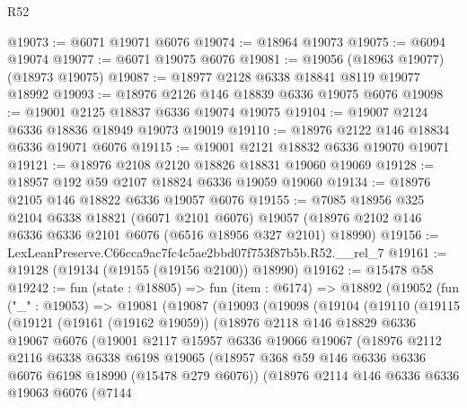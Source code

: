 \begin{lexlean}{R52}
\begin{coremodule}
@19073 := @6071 @19071 @6076
@19074 := @18964 @19073
@19075 := @6094 @19074
@19077 := @6071 @19075 @6076
@19081 := @19056 (@18963 @19077) (@18973 @19075)
@19087 := @18977 @2128 @6338 @18841 @8119 @19077 @18992
@19093 := @18976 @2126 @146 @18839 @6336 @19075 @6076
@19098 := @19001 @2125 @18837 @6336 @19074 @19075
@19104 := @19007 @2124 @6336 @18836 @18949 @19073 @19019
@19110 := @18976 @2122 @146 @18834 @6336 @19071 @6076
@19115 := @19001 @2121 @18832 @6336 @19070 @19071
@19121 := @18976 @2108 @2120 @18826 @18831 @19060 @19069
@19128 := @18957 @192 @59 @2107 @18824 @6336 @19059 @19060
@19134 := @18976 @2105 @146 @18822 @6336 @19057 @6076
@19155 := @7085
    @18956
    @325
    @2104
    @6338
    @18821
    (@6071 @2101 @6076)
    @19057
    (@18976 @2102 @146 @6336 @6336 @2101 @6076 (@6516 @18956 @327 @2101) @18990)
@19156 := LexLeanPreserve.C66cca9ac7fc4c5ae2bbd07f753f87b5b.R52.__rel_7
@19161 := @19128 (@19134 (@19155 (@19156 @2100)) @18990)
@19162 := @15478 @58
@19242 := fun (state : @18805) =>
  fun (item : @6174) =>
  @18892
    (@19052
      (fun ("_" : @19053) =>
      @19081
        (@19087
          (@19093
            (@19098
              (@19104
                (@19110
                  (@19115
                    (@19121
                      (@19161 (@19162 @19059))
                      (@18976
                        @2118
                        @146
                        @18829
                        @6336
                        @19067
                        @6076
                        (@19001
                          @2117
                          @15957
                          @6336
                          @19066
                          @19067
                          (@18976
                            @2112
                            @2116
                            @6338
                            @6338
                            @6198
                            @19065
                            (@18957
                              @368
                              @59
                              @146
                              @6336
                              @6336
                              @6076
                              @6198
                              @18990
                              (@15478 @279 @6076))
                            (@18976
                              @2114
                              @146
                              @6336
                              @6336
                              @19063
                              @6076
                              (@7144

\end{coremodule}
\end{lexlean}
